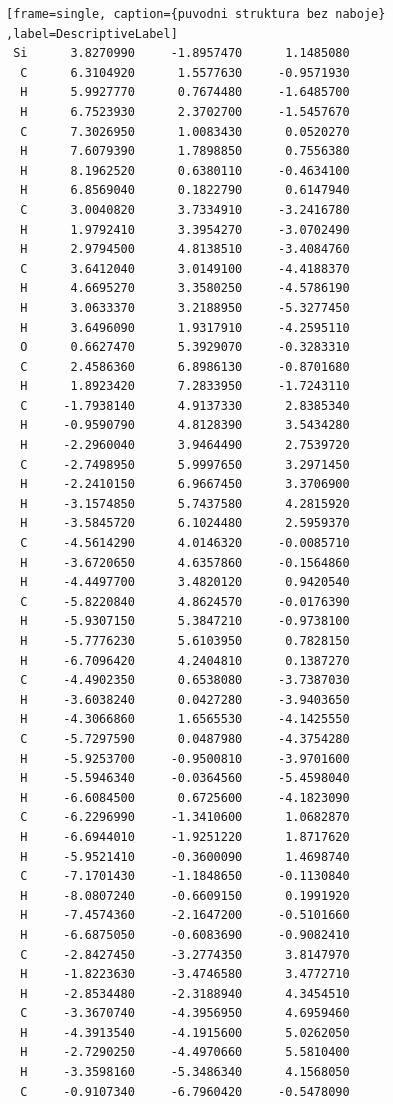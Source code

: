 \documentclass[
  digital, %
  table,   %
  lof,     %
  lot,     %
  oneside,
]{fithesis3}
\begin{document}
\begin{lstlisting}[frame=single, caption={puvodni struktura bez naboje} ,label=DescriptiveLabel]
 Si      3.8270990     -1.8957470      1.1485080
  C      6.3104920      1.5577630     -0.9571930
  H      5.9927770      0.7674480     -1.6485700
  H      6.7523930      2.3702700     -1.5457670
  C      7.3026950      1.0083430      0.0520270
  H      7.6079390      1.7898850      0.7556380
  H      8.1962520      0.6380110     -0.4634100
  H      6.8569040      0.1822790      0.6147940
  C      3.0040820      3.7334910     -3.2416780
  H      1.9792410      3.3954270     -3.0702490
  H      2.9794500      4.8138510     -3.4084760
  C      3.6412040      3.0149100     -4.4188370
  H      4.6695270      3.3580250     -4.5786190
  H      3.0633370      3.2188950     -5.3277450
  H      3.6496090      1.9317910     -4.2595110
  O      0.6627470      5.3929070     -0.3283310
  C      2.4586360      6.8986130     -0.8701680
  H      1.8923420      7.2833950     -1.7243110
  C     -1.7938140      4.9137330      2.8385340
  H     -0.9590790      4.8128390      3.5434280
  H     -2.2960040      3.9464490      2.7539720
  C     -2.7498950      5.9997650      3.2971450
  H     -2.2410150      6.9667450      3.3706900
  H     -3.1574850      5.7437580      4.2815920
  H     -3.5845720      6.1024480      2.5959370
  C     -4.5614290      4.0146320     -0.0085710
  H     -3.6720650      4.6357860     -0.1564860
  H     -4.4497700      3.4820120      0.9420540
  C     -5.8220840      4.8624570     -0.0176390
  H     -5.9307150      5.3847210     -0.9738100
  H     -5.7776230      5.6103950      0.7828150
  H     -6.7096420      4.2404810      0.1387270
  C     -4.4902350      0.6538080     -3.7387030
  H     -3.6038240      0.0427280     -3.9403650
  H     -4.3066860      1.6565530     -4.1425550
  C     -5.7297590      0.0487980     -4.3754280
  H     -5.9253700     -0.9500810     -3.9701600
  H     -5.5946340     -0.0364560     -5.4598040
  H     -6.6084500      0.6725600     -4.1823090
  C     -6.2296990     -1.3410600      1.0682870
  H     -6.6944010     -1.9251220      1.8717620
  H     -5.9521410     -0.3600090      1.4698740
  C     -7.1701430     -1.1848650     -0.1130840
  H     -8.0807240     -0.6609150      0.1991920
  H     -7.4574360     -2.1647200     -0.5101660
  H     -6.6875050     -0.6083690     -0.9082410
  C     -2.8427450     -3.2774350      3.8147970
  H     -1.8223630     -3.4746580      3.4772710
  H     -2.8534480     -2.3188940      4.3454510
  C     -3.3670740     -4.3956950      4.6959460
  H     -4.3913540     -4.1915600      5.0262050
  H     -2.7290250     -4.4970660      5.5810400
  H     -3.3598160     -5.3486340      4.1568050
  C     -0.9107340     -6.7960420     -0.5478090

\end{lstlisting}
\end{document}
